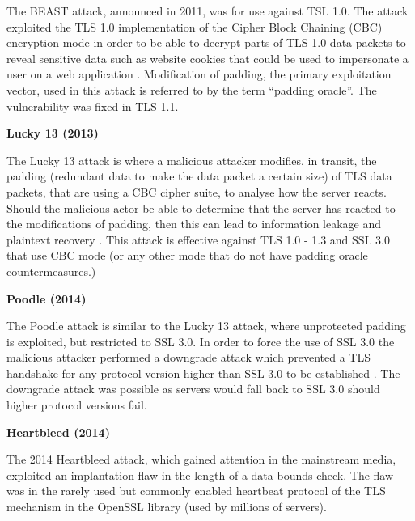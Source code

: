 \documentclass{mscreport}
\begin{document}
\vspace{0.2cm} \noindent
The BEAST attack, announced in 2011, was for use against TSL 1.0. The attack exploited the TLS 1.0 implementation of the Cipher Block Chaining (CBC) encryption mode in order to be able to decrypt parts of TLS 1.0 data packets to reveal sensitive data such as website cookies that could be used to impersonate a user on a web application \cite{Ristic2017-aj,Levillain2015-os}. Modification of padding, the primary exploitation vector, used in this attack is referred to by the term ``padding oracle''. The vulnerability was fixed in TLS 1.1.


\vspace{0.6cm} \noindent
\textbf{Lucky 13 (2013)}


\vspace{0.2cm} \noindent
The Lucky 13 attack is where a malicious attacker modifies, in transit, the padding (redundant data to make the data packet a certain size) of TLS data packets, that are using a CBC cipher suite, to analyse how the server reacts. Should the malicious actor be able to determine that the server has reacted to the modifications of padding, then this can lead to information leakage and plaintext recovery \cite{Ristic2017-aj,Al_Fardan2013-sw}. This attack is effective against TLS 1.0 - 1.3 and SSL 3.0 that use CBC mode (or any other mode that do not have padding oracle countermeasures.)


\vspace{0.6cm} \noindent
\textbf{Poodle (2014)}

\vspace{0.2cm} \noindent
The Poodle attack is similar to the Lucky 13 attack, where unprotected padding is exploited, but restricted to SSL 3.0. In order to force the use of SSL 3.0 the malicious attacker performed a downgrade attack which prevented a TLS handshake for any protocol version higher than SSL 3.0 to be established \cite{Ristic2017-aj,Al_Fardan2013-sw}. The downgrade attack was possible as servers would fall back to SSL 3.0 should higher protocol versions fail.


\vspace{0.6cm} \noindent
\textbf{Heartbleed (2014)}

\vspace{0.2cm} \noindent
The 2014 Heartbleed attack, which gained attention in the mainstream media, exploited an implantation flaw in the length of a data bounds check. The flaw was in the rarely used but commonly enabled heartbeat protocol \cite{Durumeric2014-yj} of the TLS mechanism in the OpenSSL library (used by millions of servers).
\end{document}

